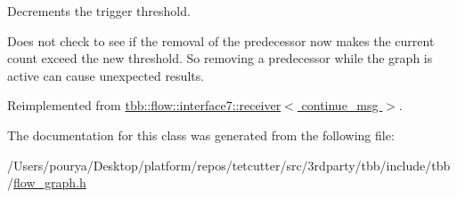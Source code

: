 Decrements the trigger threshold. 

Does not check to see if the removal of the predecessor now makes the current count exceed the new threshold. So removing a predecessor while the graph is active can cause unexpected results. 

Reimplemented from \hyperlink{classtbb_1_1flow_1_1interface7_1_1receiver_a55adae6228bbdc1539695e1ec20e9762}{tbb\+::flow\+::interface7\+::receiver$<$ continue\+\_\+msg $>$}.



The documentation for this class was generated from the following file\+:\begin{DoxyCompactItemize}
\item 
/\+Users/pourya/\+Desktop/platform/repos/tetcutter/src/3rdparty/tbb/include/tbb/\hyperlink{flow__graph_8h}{flow\+\_\+graph.\+h}\end{DoxyCompactItemize}
